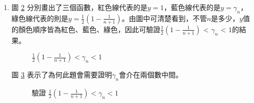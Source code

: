 \begin{enumerate}
\begin{figure}[H]
\end{figure}
\begin{figure}[H]
    \caption{於markdown紀錄運算過程}
    \label{fig:markdownriemannsum}
\end{figure}
此小題較特殊的程式碼：
\begin{lstlisting}[language=Python]
#  繪製一個填充區域。
    ax.fill_between(x, y, g, color='#FF8C00', alpha=0.5)
#  設置標註於圖中想要的位置。
ax.text(1.0,1.5,'$f(x)=\\frac{1}{x}$',fontsize='12')
ax.text(5,0.75,'$\gamma_n$ = orange area',fontsize='12')
\end{lstlisting}
\item 圖 \ref{fig:gamman_1} 分別畫出了三個函數，紅色線代表的是$y=1$，藍色線代表的是$y=\gamma_n$，綠色線代表的則是$y=\frac{1}{2}(1-\frac{1}{n+1})$。由圖中可清楚看到，不管$n$是多少，$y$值的顏色順序皆為紅色、藍色、綠色，因此可驗證$\frac{1}{2}(1-\frac{1}{n+1})$ < $\gamma_n $ < $1$的結果。
\begin{figure}[H]
    \caption{$\frac{1}{2}(1-\frac{1}{n+1})<\gamma_n < 1$}
    \label{fig:gamman_1}
\end{figure}
圖 \ref{fig:gamman_2} 表示了為何此題會需要證明$\gamma_n$會介在兩個數中間。
\begin{figure}[H]
    \caption{驗證 $\frac{1}{2}(1-\frac{1}{n+1})<\gamma_n < 1$}
    \label{fig:gamman_2}
\end{figure}
\end{enumerate}
\newpage
